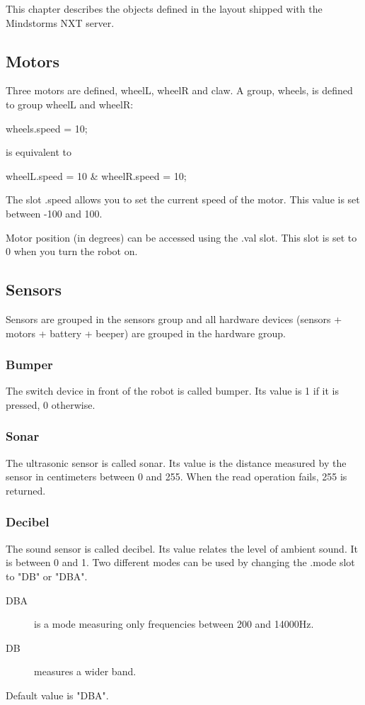 This chapter describes the objects defined in the  layout
shipped with the \urbi Mindstorms NXT server.
\subsection{Motors}
Three motors are defined, wheelL, wheelR and claw.
A group, wheels, is defined to group wheelL and wheelR:
\begin{urbiunchecked}
wheels.speed = 10;
\end{urbiunchecked}

is equivalent to
\begin{urbiunchecked}
  wheelL.speed = 10 & wheelR.speed = 10;
\end{urbiunchecked}

The slot .speed allows you to set the current speed of the motor. This value
is set between -100 and 100.

Motor position (in degrees) can be accessed using the .val slot. This
slot is set to 0 when you turn the robot on.

\subsection{Sensors}
Sensors are grouped in the sensors group and all hardware devices (sensors +
motors + battery + beeper) are grouped in the hardware group.
\subsubsection{Bumper}
The switch device in front of the robot is called bumper. Its value is 1 if
it is pressed, 0 otherwise.
\subsubsection{Sonar}
The ultrasonic sensor is called sonar.  Its value is the distance measured
by the sensor in centimeters between 0 and 255. When the read operation
fails, 255 is returned.
\subsubsection{Decibel}
The sound sensor is called decibel.  Its value relates the level of ambient
sound. It is between 0 and 1.  Two different modes can be used by changing
the .mode slot to "DB" or "DBA".
\begin{description}
\item[DBA] is a mode measuring only frequencies between 200 and 14000Hz.
\item[DB] measures a wider band.
\end{description}
Default value is "DBA".

